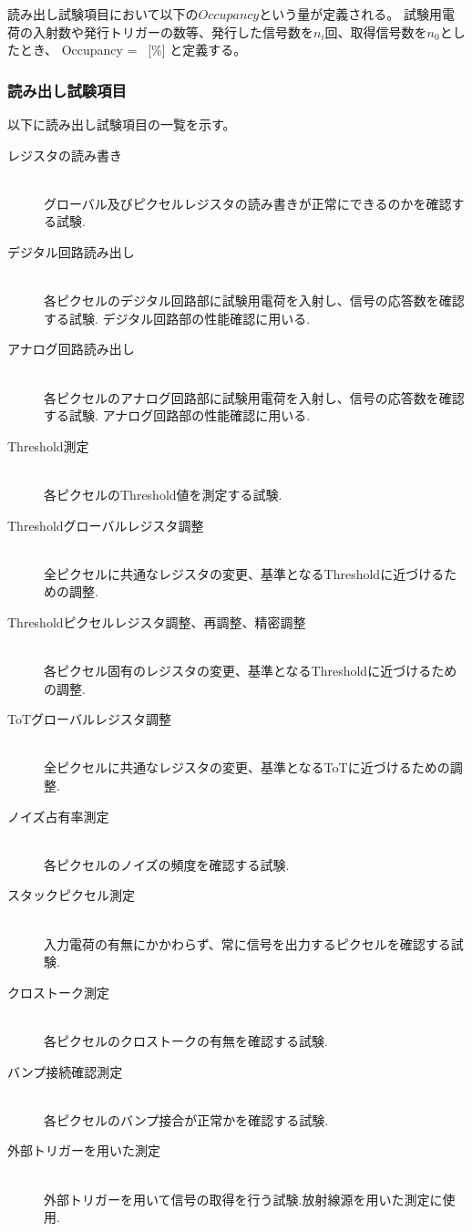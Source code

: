 読み出し試験項目において以下の$Occupancy$という量が定義される。
試験用電荷の入射数や発行トリガーの数等、発行した信号数を$n_i$回、取得信号数を$n_0$としたとき、
\bbb
\label{occupancy}
Occupancy =  ~[\%]
\eee
と定義する。

\clearpage
\subsubsection{読み出し試験項目}
以下に読み出し試験項目の一覧を示す。
\begin{description}
  \item[レジスタの読み書き]\mbox{}\\
グローバル及びピクセルレジスタの読み書きが正常にできるのかを確認する試験.
  \item[デジタル回路読み出し]\mbox{} \\
各ピクセルのデジタル回路部に試験用電荷を入射し、信号の応答数を確認する試験. デジタル回路部の性能確認に用いる.
  \item[アナログ回路読み出し]\mbox{}\\
各ピクセルのアナログ回路部に試験用電荷を入射し、信号の応答数を確認する試験. アナログ回路部の性能確認に用いる.
  \item[Threshold測定]\mbox{}\\
各ピクセルのThreshold値を測定する試験.
  \item[Thresholdグローバルレジスタ調整]\mbox{}\\
全ピクセルに共通なレジスタの変更、基準となるThresholdに近づけるための調整.
  \item[Thresholdピクセルレジスタ調整、再調整、精密調整]\mbox{}\\
各ピクセル固有のレジスタの変更、基準となるThresholdに近づけるための調整.
  \item[ToTグローバルレジスタ調整]\mbox{}\\
全ピクセルに共通なレジスタの変更、基準となるToTに近づけるための調整.
  \item[ノイズ占有率測定]\mbox{}\\
各ピクセルのノイズの頻度を確認する試験.
  \item[スタックピクセル測定]\mbox{}\\
入力電荷の有無にかかわらず、常に信号を出力するピクセルを確認する試験.
  \item[クロストーク測定]\mbox{}\\
各ピクセルのクロストークの有無を確認する試験.
  \item[バンプ接続確認測定]\mbox{}\\
各ピクセルのバンプ接合が正常かを確認する試験.
  \item[外部トリガーを用いた測定]\mbox{}\\
外部トリガーを用いて信号の取得を行う試験.放射線源を用いた測定に使用.
\end{description}

